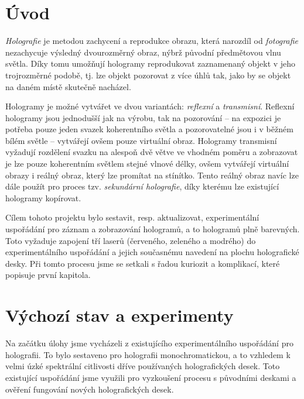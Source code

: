 \documentclass[twoside,project]{../MFFPrace}
\begin{document}
\maketitle
\tableofcontents
\chapter*{Úvod}
\textit{Holografie} je metodou zachycení a reprodukce obrazu, která narozdíl od \textit{fotografie} nezachycuje výsledný dvourozměrný obraz, nýbrž původní předmětovou vlnu světla. Díky tomu umožňují hologramy reprodukovat zaznamenaný objekt v jeho trojrozměrné podobě, tj. lze objekt pozorovat z více úhlů tak, jako by se objekt na daném místě skutečně nacházel.

Hologramy je možné vytvářet ve dvou variantách: \textit{reflexní} a \textit{transmisní}. Reflexní hologramy jsou jednodušší jak na výrobu, tak na pozorování -- na expozici je potřeba pouze jeden svazek koherentního světla a pozorovatelné jsou i v běžném bílém světle -- vytvářejí ovšem pouze virtuální obraz. Hologramy transmisní vyžadují rozdělení svazku na alespoň dvě větve ve vhodném poměru a zobrazovat je lze pouze koherentním světlem stejné vlnové délky, ovšem vytvářejí virtuální obrazy i reálný obraz, který lze promítat na stínítko. Tento reálný obraz navíc lze dále použít pro proces tzv. \textit{sekundární holografie}, díky kterému lze existující hologramy kopírovat.

Cílem tohoto projektu bylo sestavit, resp. aktualizovat, experimentální uspořádání pro záznam a zobrazování hologramů, a to hologramů plně barevných. Toto vyžaduje zapojení tří laserů (červeného, zeleného a modrého) do experimentálního uspořádání a jejich současnému navedení na plochu holografické desky. Při tomto procesu jsme se setkali s řadou kuriozit a komplikací, které popisuje první kapitola.

\chapter{Výchozí stav a experimenty}
\begin{center}
    Na začátku úlohy jsme vycházeli z existujícího experimentálního uspořádání pro holografii. To bylo sestaveno pro holografii monochromatickou, a to vzhledem k velmi úzké spektrální citlivosti dříve používaných holografických desek. Toto existující uspořádání jsme využili pro vyzkoušení procesu s původními deskami a ověření fungování nových holografických desek.
\end{center}
\end{document}
